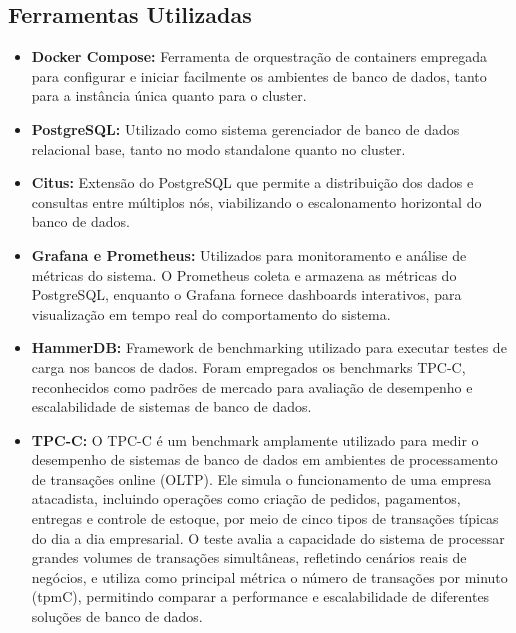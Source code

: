 \subsection{Ferramentas Utilizadas}
\begin{itemize}
    \item \textbf{Docker Compose:} 
	Ferramenta de orquestração de containers empregada para configurar e iniciar facilmente os ambientes de banco de dados, 
	tanto para a instância única quanto para o cluster.
	
	\item \textbf{PostgreSQL:} 
	Utilizado como sistema gerenciador de banco de dados relacional base,
	tanto no modo standalone quanto no cluster.
    
    \item \textbf{Citus:} 
	Extensão do PostgreSQL que permite a distribuição dos dados e consultas entre múltiplos nós,
	viabilizando o escalonamento horizontal do banco de dados.
    
    \item \textbf{Grafana e Prometheus:} 
	Utilizados para monitoramento e análise de métricas do sistema. 
	O Prometheus coleta e armazena as métricas do PostgreSQL, enquanto o Grafana fornece dashboards interativos,
	para visualização em tempo real do comportamento do sistema.
    
    \item \textbf{HammerDB:}
	Framework de benchmarking utilizado para executar testes de carga nos bancos de dados.
	Foram empregados os benchmarks TPC-C, 
	reconhecidos como padrões de mercado para avaliação de desempenho e escalabilidade de sistemas de banco de dados.

	\item \textbf{TPC-C:}
	O TPC-C é um benchmark amplamente utilizado para medir o desempenho de sistemas de banco de dados em ambientes 
	de processamento de transações online (OLTP). Ele simula o funcionamento de uma empresa atacadista,
	incluindo operações como criação de pedidos, pagamentos, entregas e controle de estoque,
	por meio de cinco tipos de transações típicas do dia a dia empresarial.
	O teste avalia a capacidade do sistema de processar grandes volumes de transações simultâneas,
	refletindo cenários reais de negócios, e utiliza como principal métrica o número de transações por minuto (tpmC),
	permitindo comparar a performance e escalabilidade de diferentes soluções de banco de dados.
	

\end{itemize}
